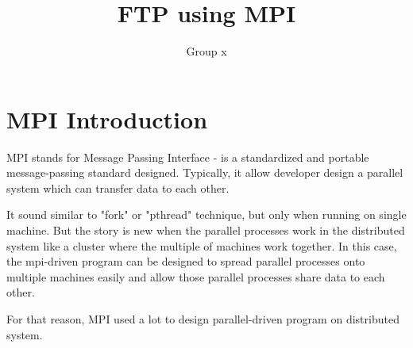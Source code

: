 \documentclass{article}
\title{FTP using MPI}
\author{Group x}
\begin{document}
\maketitle
\section{MPI Introduction}
MPI stands for Message Passing Interface - is a standardized and portable message-passing standard designed.
Typically, it allow developer design a parallel system which can transfer data to each other.

It sound similar to "fork" or "pthread" technique, but only when running on single machine. But the story is new when the parallel processes work in the distributed system like a cluster where the multiple of machines work together.
In this case, the mpi-driven program can be designed to spread parallel processes onto multiple machines easily and allow those parallel processes share data to each other.

For that reason, MPI used a lot to design parallel-driven program on distributed system.
\end{document}
